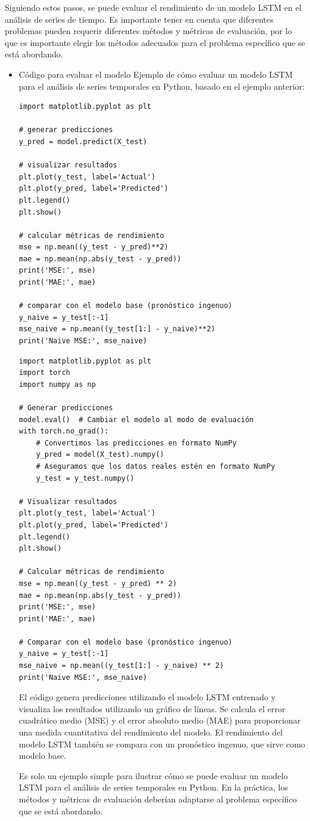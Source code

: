 \documentclass[11pt]{article}
\begin{document}
Siguiendo estos pasos, se puede evaluar el rendimiento de un modelo
LSTM en el análisis de series de tiempo. Es importante tener en cuenta
que diferentes problemas pueden requerir diferentes métodos y métricas
de evaluación, por lo que es importante elegir los métodos adecuados
para el problema específico que se está abordando.

\begin{itemize}
\item Código para evaluar el modelo
\label{sec:org89679bf}
Ejemplo de cómo evaluar un modelo LSTM para el análisis de series
temporales en Python, basado en el ejemplo anterior:
\begin{verbatim}
import matplotlib.pyplot as plt

# generar predicciones
y_pred = model.predict(X_test)

# visualizar resultados
plt.plot(y_test, label='Actual')
plt.plot(y_pred, label='Predicted')
plt.legend()
plt.show()

# calcular métricas de rendimiento
mse = np.mean((y_test - y_pred)**2)
mae = np.mean(np.abs(y_test - y_pred))
print('MSE:', mse)
print('MAE:', mae)

# comparar con el modelo base (pronóstico ingenuo)
y_naive = y_test[:-1]
mse_naive = np.mean((y_test[1:] - y_naive)**2)
print('Naive MSE:', mse_naive)
\end{verbatim}

\begin{verbatim}
import matplotlib.pyplot as plt
import torch
import numpy as np

# Generar predicciones
model.eval()  # Cambiar el modelo al modo de evaluación
with torch.no_grad():
    # Convertimos las predicciones en formato NumPy
    y_pred = model(X_test).numpy()
    # Aseguramos que los datos reales estén en formato NumPy
    y_test = y_test.numpy()

# Visualizar resultados
plt.plot(y_test, label='Actual')
plt.plot(y_pred, label='Predicted')
plt.legend()
plt.show()

# Calcular métricas de rendimiento
mse = np.mean((y_test - y_pred) ** 2)
mae = np.mean(np.abs(y_test - y_pred))
print('MSE:', mse)
print('MAE:', mae)

# Comparar con el modelo base (pronóstico ingenuo)
y_naive = y_test[:-1]
mse_naive = np.mean((y_test[1:] - y_naive) ** 2)
print('Naive MSE:', mse_naive)
\end{verbatim}


El código genera predicciones utilizando el modelo LSTM entrenado y
visualiza los resultados utilizando un gráfico de líneas. Se calcula
el error cuadrático medio (MSE) y el error absoluto medio (MAE) para
proporcionar una medida cuantitativa del rendimiento del modelo. El
rendimiento del modelo LSTM también se compara con un pronóstico
ingenuo, que sirve como modelo base.

Es solo un ejemplo simple para ilustrar cómo se puede evaluar un
modelo LSTM para el análisis de series temporales en Python. En la
práctica, los métodos y métricas de evaluación deberían adaptarse al
problema específico que se está abordando.
\end{itemize}
\end{document}
